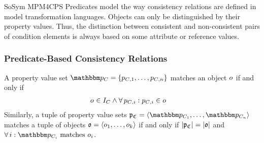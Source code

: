 \begin{copiedFrom}{SoSym MPM4CPS}
Predicates model the way consistency relations are defined in %
model transformation languages. Objects can only be distinguished by their property values. Thus, the distinction between consistent and non-consistent pairs of condition elements is always based on some attribute or reference values.

\subsubsection{Predicate-Based Consistency Relations}

\begin{definition}
A property value set $\propertyvalueset{p}{\class{C}{}} = \{p_{\class{C}{}, 1}, \dots, p_{\class{C}{}, n}\}$ matches an object $\object{o}{}$ if and only if
\begin{align*}
    &
    \object{o}{} \in I_{\class{C}{}} \wedge \forall p_{\class{C}{}, i} : p_{\class{C}{}, i} \in \object{o}{}
\end{align*}
%
Similarly, a tuple of property value sets $\propertyvaluesettuple{p}{\classtuple{C}{}} = \tupled{\propertyvalueset{p}{\class{C}{1}}, \dots, \propertyvalueset{p}{\class{C}{n}}}$ matches a tuple of objects $\tuple{o} = \tupled{\object{o}{1}, \dots, \object{o}{k}}$ if and only if $|\tuple{p}_{\classtuple{C}{}}| = |\tuple{o}|$ and $\forall i : \propertyvalueset{p}{\class{C}{i}}\ \text{matches}\ \object{o}{i}$.
\end{definition}


\end{copiedFrom}

